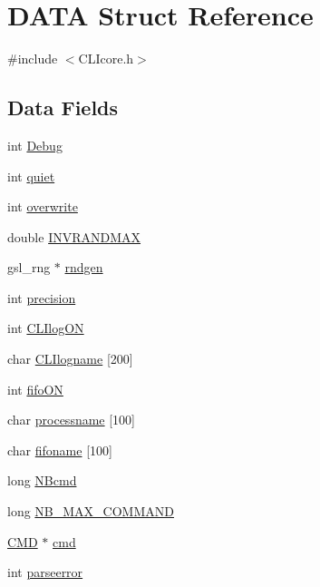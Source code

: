 \hypertarget{structDATA}{\section{D\+A\+T\+A Struct Reference}
\label{structDATA}
}


{\ttfamily \#include $<$C\+L\+Icore.\+h$>$}

\subsection*{Data Fields}
\begin{DoxyCompactItemize}
\item 
int \hyperlink{structDATA_a8148a9459923d124f03989f0c796e137}{Debug}
\item 
int \hyperlink{structDATA_a3f7eda27560572dd2510250a1935deb5}{quiet}
\item 
int \hyperlink{structDATA_a600cb8c85d463a76ca1dfe9d0097c8f3}{overwrite}
\item 
double \hyperlink{structDATA_aa17d253cb7412ac4cbc8f034dfe78308}{I\+N\+V\+R\+A\+N\+D\+M\+A\+X}
\item 
gsl\+\_\+rng $\ast$ \hyperlink{structDATA_a819c0e911d771dbb7da0dbf26e993fc2}{rndgen}
\item 
int \hyperlink{structDATA_a7b6fce0fc9e6046ffa57b30b8bcd0d1f}{precision}
\item 
int \hyperlink{structDATA_abfc40a5bf0093716bcc793aca3ec678c}{C\+L\+Ilog\+O\+N}
\item 
char \hyperlink{structDATA_aa491474d93756c181862fb907c777b78}{C\+L\+Ilogname} \mbox{[}200\mbox{]}
\item 
int \hyperlink{structDATA_a37b44a7ef0d3d29f33bf3700ec28665e}{fifo\+O\+N}
\item 
char \hyperlink{structDATA_a58978653cfb98eaf9b9007cb992cc0e4}{processname} \mbox{[}100\mbox{]}
\item 
char \hyperlink{structDATA_ac3b98b39c316089481ab31820a1f4b21}{fifoname} \mbox{[}100\mbox{]}
\item 
long \hyperlink{structDATA_ab3ecb17b2561794d854efcbc47584b19}{N\+Bcmd}
\item 
long \hyperlink{structDATA_afc7d56480cf2e6f4b91ed95be0466d44}{N\+B\+\_\+\+M\+A\+X\+\_\+\+C\+O\+M\+M\+A\+N\+D}
\item 
\hyperlink{structCMD}{C\+M\+D} $\ast$ \hyperlink{structDATA_af0e58ce879fa3017d9131eed5a90cc96}{cmd}
\item 
int \hyperlink{structDATA_a04c14ba8ea1844e3f68888dca0fe3519}{parseerror}

\end{DoxyCompactItemize}
